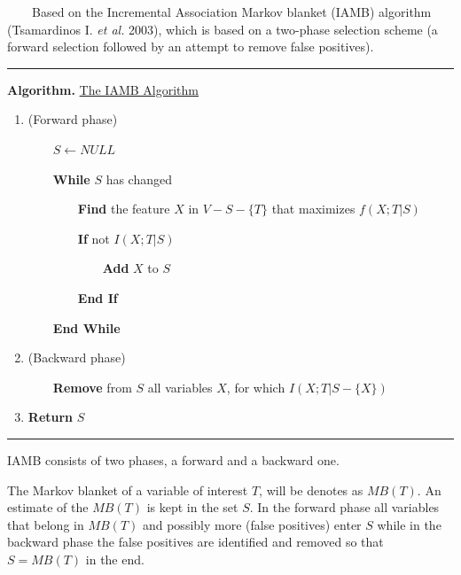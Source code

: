 ~~~~Based on the Incremental Association Markov blanket (IAMB) algorithm (Tsamardinos I. \emph{et al.} 2003), which is based on a two-phase selection scheme (a forward selection followed by an attempt to remove false positives).

\begin{center}\rule[0.5ex]{0.9\columnwidth}{1pt}\end{center}

\textbf{Algorithm.} \underline{The IAMB Algorithm}

\begin{enumerate}
	\item (Forward phase)
	
	~~~~$S \leftarrow NULL$
	
	~~~~\textbf{While} $S$ has changed
	
	~~~~~~~~\textbf{Find} the feature $X$ in $V-S-\{T\}$ that maximizes $f(X ; T|S)$
	
	~~~~~~~~\textbf{If} not $I(X ; T|S)$
	
	~~~~~~~~~~~~\textbf{Add} $X$ to $S$
	
	~~~~~~~~\textbf{End If}
	
	~~~~\textbf{End While}
	
	\item (Backward phase)

	~~~~\textbf{Remove} from $S$ all variables $X$, for which $I(X ; T|S-\{X\})$
	
	\item \textbf{Return} $S$
\end{enumerate}

\begin{center}\rule[0.5ex]{0.9\columnwidth}{1pt}\end{center}

IAMB consists of two phases, a forward and a backward one.

The Markov blanket of a variable of interest $T$, will be denotes as $MB(T)$. An estimate of the $MB(T)$ is kept in the set $S$. In the forward phase all variables that belong in $MB(T)$ and possibly more (false positives) enter $S$ while in the backward phase the false positives are identified and removed so that $S = MB(T)$ in the end.